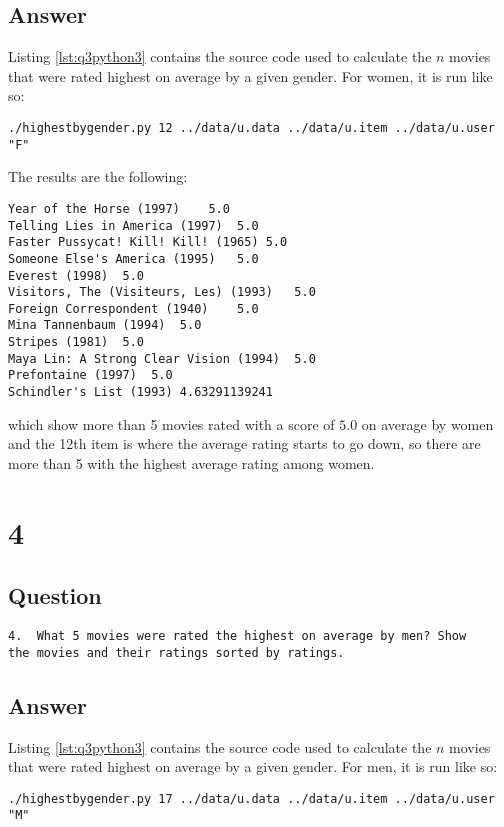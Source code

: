 \documentclass[letterpaper,11pt]{article}
\begin{document}
\newpage
\subsection*{Answer}

Listing \ref{lst:q3python3} contains the source code used to calculate the $n$ movies that were rated highest on average by a given gender.  For women, it is run like so:
\begin{lstlisting}[frame=single]
./highestbygender.py 12 ../data/u.data ../data/u.item ../data/u.user  "F"
\end{lstlisting}

The results are the following:
\begin{lstlisting}[frame=single]
Year of the Horse (1997)	5.0
Telling Lies in America (1997)	5.0
Faster Pussycat! Kill! Kill! (1965)	5.0
Someone Else's America (1995)	5.0
Everest (1998)	5.0
Visitors, The (Visiteurs, Les) (1993)	5.0
Foreign Correspondent (1940)	5.0
Mina Tannenbaum (1994)	5.0
Stripes (1981)	5.0
Maya Lin: A Strong Clear Vision (1994)	5.0
Prefontaine (1997)	5.0
Schindler's List (1993)	4.63291139241
\end{lstlisting}
which show more than 5 movies rated with a score of $5.0$  on average by women and the 12th item is where the average rating starts to go down, so there are more than 5 with the highest average rating among women.

\newpage

\section*{4}

\subsection*{Question}

\begin{verbatim}
4.  What 5 movies were rated the highest on average by men? Show
the movies and their ratings sorted by ratings.
\end{verbatim}

\newpage
\subsection*{Answer}

Listing \ref{lst:q3python3} contains the source code used to calculate the $n$ movies that were rated highest on average by a given gender.  For men, it is run like so:
\begin{lstlisting}[frame=single]
./highestbygender.py 17 ../data/u.data ../data/u.item ../data/u.user  "M"
\end{lstlisting}
\end{document}
